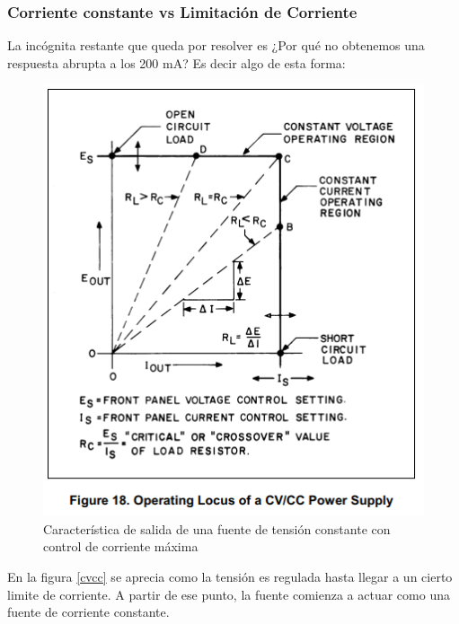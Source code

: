 \subsubsection{Corriente constante vs Limitación de Corriente}
La incógnita restante que queda por resolver es ¿Por qué no obtenemos una respuesta abrupta a los 200 mA?
Es decir algo de esta forma:
\begin{figure}[H]
	\centering
	\includegraphics[scale=0.7]{ImagenesEjercicio1/CVCC}
	\caption{Característica de salida de una fuente de tensión constante con control de corriente máxima}
	\label{fig:cvcc}
\end{figure}
En la figura \ref{cvcc} se aprecia como la tensión es regulada hasta llegar a un cierto limite de corriente. A partir de ese punto, la fuente comienza a actuar como una fuente de corriente constante.


